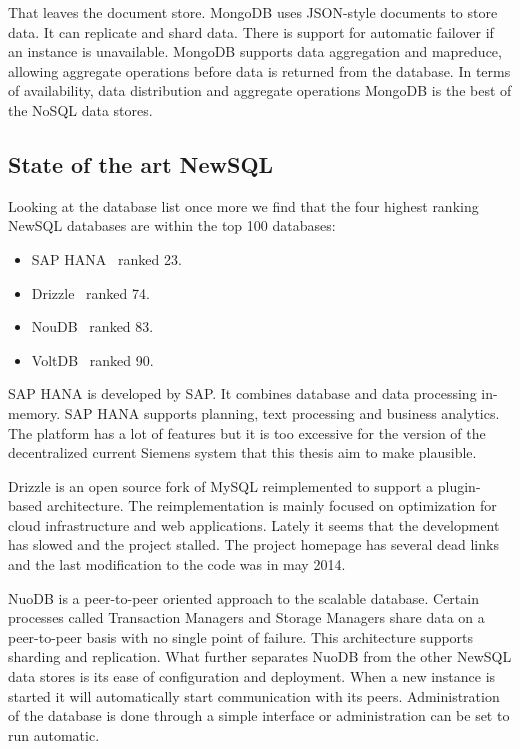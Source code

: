 That leaves the document store. MongoDB uses JSON-style documents to store data.
It can replicate and shard data. 
There is support for automatic failover if an instance is unavailable.
MongoDB supports data aggregation and mapreduce, allowing aggregate operations before data is returned from the database.
In terms of availability, data distribution and aggregate operations MongoDB is the best of the NoSQL data stores.

\subsection{State of the art NewSQL}
Looking at the  database list once more we find that the four highest ranking NewSQL databases are within the top 100 databases:

\begin{itemize}
\item SAP HANA~\cite{saphana} ranked 23.
\item Drizzle~\cite{drizzle} ranked 74.
\item NouDB~\cite{nuodb} ranked 83.
\item VoltDB~\cite{voltdb} ranked 90.
\end{itemize}

SAP HANA is developed by SAP.
It combines database and data processing in-memory.
SAP HANA supports planning, text processing and business analytics.
The platform has a lot of features but it is too excessive for the version of the decentralized current Siemens system that this thesis aim to make plausible.

Drizzle is an open source fork of MySQL reimplemented to support a plugin-based architecture.
The reimplementation is mainly focused on optimization for cloud infrastructure and web applications.
Lately it seems that the development has slowed and the project stalled.
The project homepage has several dead links and the last modification to the code was in may 2014.

NuoDB is a peer-to-peer oriented approach to the scalable database. Certain processes called Transaction Managers and Storage Managers share data on a peer-to-peer basis with no single point of failure.
This architecture supports sharding and replication.
What further separates NuoDB from the other NewSQL data stores is its ease of configuration and deployment. When a new instance is started it will automatically start communication with its peers. Administration of the database is done through a simple interface or administration can be set to run automatic.

